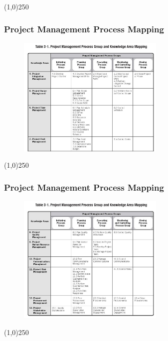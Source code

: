\begin{center}\line(1,0){250}\end{center}



\begin{frame}
\frametitle{Project Management Process Mapping}
 \begin{figure}
 	\centering
 		\includegraphics[width = 7cm]{images/tbl3-1a.jpg}
 	\label{tbl:3-1a}
 \end{figure}
\end{frame}
\begin{center}\line(1,0){250}\end{center}



\begin{frame}
\frametitle{Project Management Process Mapping}
 \begin{figure}
 	\centering
 		\includegraphics[width = 7cm]{images/tbl3-1b.jpg}
 	\label{tbl3-1b}
 \end{figure}
\end{frame}
\begin{center}\line(1,0){250}\end{center}


